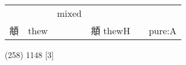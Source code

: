 \documentclass[14pt,a4paper]{scrartcl}
\begin{document}
\begin{longtable}[c]{@{}llllll@{}}
\begin{minipage}[t]{0.14\columnwidth}
\strut\end{minipage} &
\begin{minipage}[t]{0.14\columnwidth}\raggedright\strut
\strut\end{minipage} &
\begin{minipage}[t]{0.14\columnwidth}\raggedright\strut
mixed
\strut\end{minipage}\tabularnewline
\begin{minipage}[t]{0.14\columnwidth}\raggedright\strut
頫
\strut\end{minipage} &
\begin{minipage}[t]{0.14\columnwidth}\raggedright\strut
thew
\strut\end{minipage} &
\begin{minipage}[t]{0.14\columnwidth}\raggedright\strut
\strut\end{minipage} &
\begin{minipage}[t]{0.14\columnwidth}\raggedright\strut
頫 thewH
\strut\end{minipage} &
\begin{minipage}[t]{0.14\columnwidth}\raggedright\strut
\strut\end{minipage} &
\begin{minipage}[t]{0.14\columnwidth}\raggedright\strut
pure:A
\strut\end{minipage}\tabularnewline
\bottomrule
\end{longtable}

(258) 1148 {[}3{]}
\end{document}
